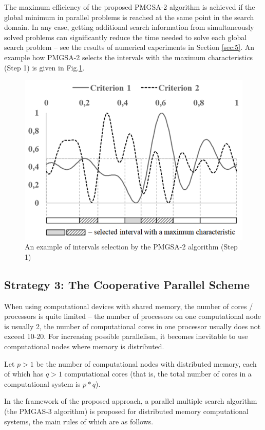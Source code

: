 \documentclass[review]{elsarticle}
\begin{document}
The maximum efficiency of the proposed PMGSA-2 algorithm is achieved if the global minimum in parallel problems is reached at the same point in the search domain. In any case, getting additional search information from simultaneously solved problems can significantly reduce the time needed to solve each global search problem -- see the results of numerical experiments in Section \ref{sec:5}. An example how PMGSA-2 selects the intervals with the maximum characteristics (Step 1) is given in Fig.\ref{fig:3}.

\begin{figure}
  \centering
  \includegraphics[width=0.7\linewidth]{fig3}
  \caption{An example of intervals selection by the PMGSA-2 algorithm (Step 1)}
  \label{fig:3}
\end{figure}

\subsection{Strategy 3: The Cooperative Parallel Scheme} \label{subsec:3}

When using computational devices with shared memory, the number of cores / processors is quite limited -- the number of processors on one computational node is usually 2, the number of computational cores in one processor usually does not exceed 10-20. For increasing possible parallelism, it becomes inevitable to use computational nodes where memory is distributed.

Let $p>1$ be the number of computational nodes with distributed memory, each of which has $q>1$ computational cores (that is, the total number of cores in a computational system is $p*q$). 

In the framework of the proposed approach, a parallel multiple search algorithm (the PMGAS-3 algorithm) is proposed for distributed memory computational systems, the main rules of which are as follows.
\end{document}
